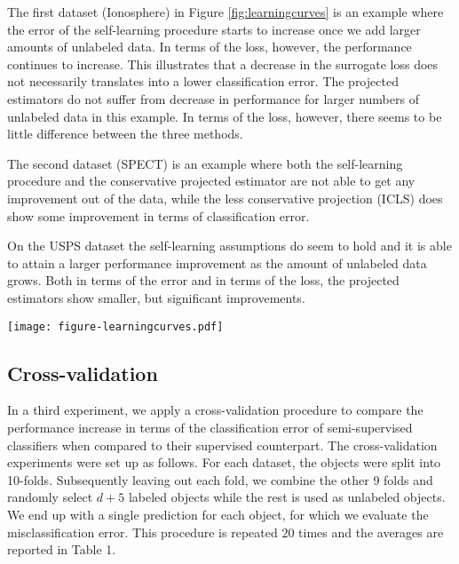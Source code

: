 \documentclass[sts,preprint]{imsart-custom}
\begin{document}
The first dataset (Ionosphere) in Figure \ref{fig:learningcurves} is an example where the error of the self-learning procedure starts to increase once we add larger amounts of unlabeled data. In terms of the loss, however, the performance continues to increase. This illustrates that a decrease in the surrogate loss does not necessarily translates into a lower classification error. The projected estimators do not suffer from decrease in performance for larger numbers of unlabeled data in this example. In terms of the loss, however, there seems to be little difference between the three methods.

The second dataset (SPECT) is an example where both the self-learning procedure and the conservative projected estimator are not able to get any improvement out of the data, while the less conservative projection (ICLS) does show some improvement in terms of classification error.

On the USPS dataset the self-learning assumptions do seem to hold and it is able to attain a larger performance improvement as the amount of unlabeled data grows. Both in terms of the error and in terms of the loss, the projected estimators show smaller, but significant improvements.

\begin{figure*}
\centering
\texttt{[image: figure-learningcurves.pdf]}
\caption{Learning curves in terms of classification errors (top) and quadratic loss (bottom) on the test set for increasing numbers of \emph{unlabeled} data on three illustrative datasets. The lines indicate average errors respectively losses on the test set, averaged over $1000$ repeats. The shaded bars indicate $\pm 2$ standard errors around the mean.}
\label{fig:learningcurves}
\end{figure*}

\subsection{Cross-validation}
In a third experiment, we apply a cross-validation procedure to compare the performance increase in terms of the classification error of semi-supervised classifiers when compared to their supervised counterpart. The cross-validation experiments were set up as follows. For each dataset, the objects were split into 10-folds. Subsequently leaving out each fold, we combine the other 9 folds and randomly select $d+5$ labeled objects while the rest is used as unlabeled objects. We end up with a single prediction for each object, for which we evaluate the misclassification error. This procedure is repeated $20$ times and the averages are reported in Table 1.
\end{document}

